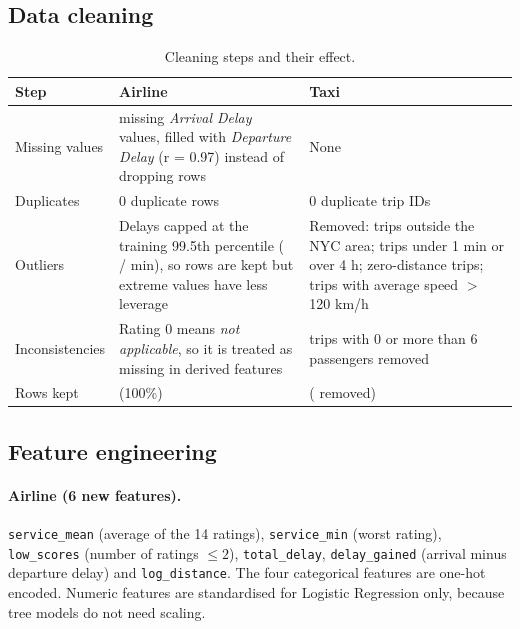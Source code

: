 \documentclass[11pt,a4paper]{article}
\begin{document}
\subsection{Data cleaning}

\begin{table}[H]\centering\small
\caption{Cleaning steps and their effect.}
\begin{tabularx}{\textwidth}{@{}p{2.6cm}LL@{}}
\toprule
Step & \textbf{Airline} & \textbf{Taxi} \\
\midrule
Missing values & \airMissing{} missing \emph{Arrival Delay} values, filled with \emph{Departure Delay} (r = 0.97) instead of dropping rows & None \\
Duplicates & 0 duplicate rows & 0 duplicate trip IDs \\
Outliers & Delays capped at the training 99.5th percentile (\airCapDep{} / \airCapArr{} min), so rows are kept but extreme values have less leverage & Removed: \taxiOutBox{} trips outside the NYC area; \taxiBadDur{} trips under 1 min or over 4 h; \taxiZeroDist{} zero-distance trips; \taxiFast{} trips with average speed $>$ 120 km/h \\
Inconsistencies & Rating 0 means \emph{not applicable}, so it is treated as missing in derived features & \taxiBadPax{} trips with 0 or more than 6 passengers removed \\
Rows kept & \airRows{} (100\%) & \taxiKept{} (\taxiRemovedPct{} removed) \\
\bottomrule
\end{tabularx}
\end{table}

\subsection{Feature engineering}

\paragraph{Airline (6 new features).} \texttt{service\_mean} (average of the 14 ratings), \texttt{service\_min} (worst rating), \texttt{low\_scores} (number of ratings $\le 2$), \texttt{total\_delay}, \texttt{delay\_gained} (arrival minus departure delay) and \texttt{log\_distance}. The four categorical features are one-hot encoded. Numeric features are standardised for Logistic Regression only, because tree models do not need scaling.
\end{document}
